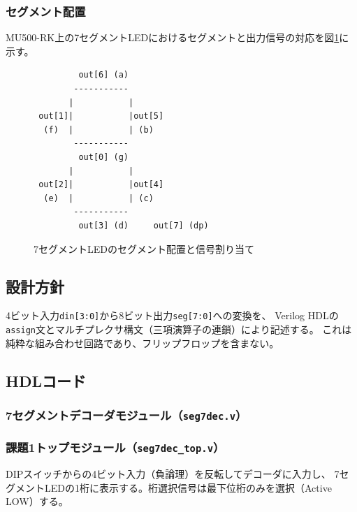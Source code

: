 \documentclass[a4paper,11pt]{ltjsarticle}
\begin{document}
\subsubsection{セグメント配置}

MU500-RK上の7セグメントLEDにおけるセグメントと出力信号の対応を図\ref{fig:seg_layout}に示す。

\begin{figure}[h]
\centering
\begin{verbatim}
         out[6] (a)
        -----------
       |           |
 out[1]|           |out[5]
  (f)  |           | (b)
        -----------
         out[0] (g)
       |           |
 out[2]|           |out[4]
  (e)  |           | (c)
        -----------
         out[3] (d)     out[7] (dp)
\end{verbatim}
\caption{7セグメントLEDのセグメント配置と信号割り当て}
\label{fig:seg_layout}
\end{figure}

\subsection{設計方針}

4ビット入力\texttt{din[3:0]}から8ビット出力\texttt{seg[7:0]}への変換を、
Verilog HDLの\texttt{assign}文とマルチプレクサ構文（三項演算子の連鎖）により記述する。
これは純粋な組み合わせ回路であり、フリップフロップを含まない。

\subsection{HDLコード}

\subsubsection{7セグメントデコーダモジュール（\texttt{seg7dec.v}）}



\subsubsection{課題1トップモジュール（\texttt{seg7dec\_top.v}）}

DIPスイッチからの4ビット入力（負論理）を反転してデコーダに入力し、
7セグメントLEDの1桁に表示する。桁選択信号は最下位桁のみを選択（Active LOW）する。


\end{document}
